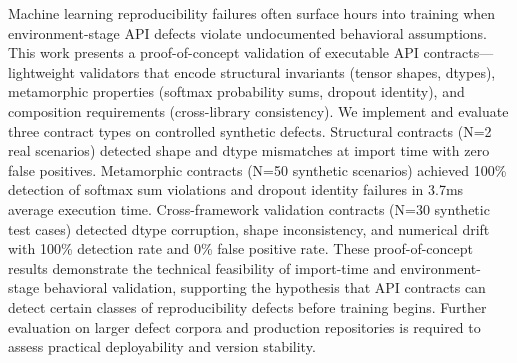 
Machine learning reproducibility failures often surface hours into training when environment-stage API defects violate undocumented behavioral assumptions. This work presents a proof-of-concept validation of executable API contracts---lightweight validators that encode structural invariants (tensor shapes, dtypes), metamorphic properties (softmax probability sums, dropout identity), and composition requirements (cross-library consistency). We implement and evaluate three contract types on controlled synthetic defects. Structural contracts (N=2 real scenarios) detected shape and dtype mismatches at import time with zero false positives. Metamorphic contracts (N=50 synthetic scenarios) achieved 100\% detection of softmax sum violations and dropout identity failures in 3.7ms average execution time. Cross-framework validation contracts (N=30 synthetic test cases) detected dtype corruption, shape inconsistency, and numerical drift with 100\% detection rate and 0\% false positive rate. These proof-of-concept results demonstrate the technical feasibility of import-time and environment-stage behavioral validation, supporting the hypothesis that API contracts can detect certain classes of reproducibility defects before training begins. Further evaluation on larger defect corpora and production repositories is required to assess practical deployability and version stability.
